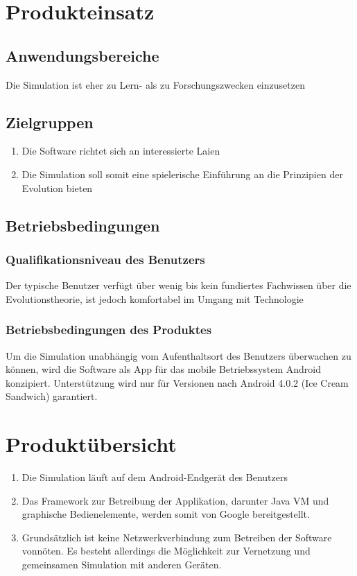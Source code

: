 \documentclass[a4paper, 10pt]{article}
\begin{document}
\section{Produkteinsatz}
\subsection{Anwendungsbereiche}
Die Simulation ist eher zu Lern- als zu Forschungszwecken einzusetzen
\subsection{Zielgruppen}
\begin{enumerate}
\item Die Software richtet sich an interessierte Laien
\item Die Simulation soll somit eine spielerische Einführung an die Prinzipien der Evolution bieten
\end{enumerate}

\subsection{Betriebsbedingungen}
\subsubsection{Qualifikationsniveau des Benutzers}
Der typische Benutzer verfügt über wenig bis kein fundiertes Fachwissen über die Evolutionstheorie, ist jedoch komfortabel im Umgang mit Technologie
\subsubsection{Betriebsbedingungen des Produktes}
Um die Simulation unabhängig vom Aufenthaltsort des Benutzers überwachen zu können, wird die Software als App für das mobile Betriebssystem Android konzipiert. Unterstützung wird nur für Versionen nach Android 4.0.2 (Ice Cream Sandwich) garantiert.

\section{Produktübersicht}
\begin{enumerate}
\item
Die Simulation läuft auf dem Android-Endgerät des Benutzers
\item
Das Framework zur Betreibung der Applikation, darunter Java VM und graphische Bedienelemente, werden somit von Google bereitgestellt.
\item
Grundsätzlich ist keine Netzwerkverbindung zum Betreiben der Software vonnöten. Es besteht allerdings die Möglichkeit zur Vernetzung und gemeinsamen Simulation mit anderen Geräten.
\end{enumerate}
\end{document}
